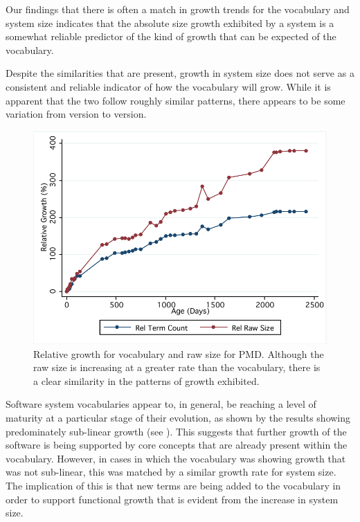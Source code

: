Our findings that there is often a match in growth trends for the vocabulary and system size indicates that the absolute size growth exhibited by a system is a somewhat reliable predictor of the kind of growth that can be expected of the vocabulary.

Despite the similarities that are present, growth in system size does not serve as a consistent and reliable indicator of how the vocabulary will grow. While it is apparent that the two follow roughly similar patterns, there appears to be some variation from version to version.

\begin{figure}[t]
\centering
\includegraphics[width=\textwidth]{Figures/Vocab-PMDComparativeGrowth.pdf}
\caption{Relative growth for vocabulary and raw size for PMD. Although the raw size is increasing at a greater rate than the vocabulary, there is a clear similarity in the patterns of growth exhibited.}
\label{fig:comparative_growth_pmd}
\end{figure}

Software system vocabularies appear to, in general, be reaching a level of maturity at a particular stage of their evolution, as shown by the results showing predominately sub-linear growth (see ). This suggests that further growth of the software is being supported by core concepts that are already present within the vocabulary. However, in cases in which the vocabulary was showing growth that was not sub-linear, this was matched by a similar growth rate for system size. The implication of this is that new terms are being added to the vocabulary in order to support functional growth that is evident from the increase in system size.

